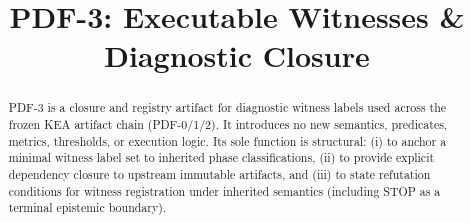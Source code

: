 \documentclass[11pt]{article}
\title{PDF-3: Executable Witnesses \& Diagnostic Closure}
\author{}
\date{}
\begin{document}
\maketitle

\begin{abstract}
PDF-3 is a closure and registry artifact for diagnostic witness labels used across the
frozen KEA artifact chain (PDF-0/1/2). It introduces no new semantics, predicates,
metrics, thresholds, or execution logic. Its sole function is structural: (i) to anchor
a minimal witness label set to inherited phase classifications, (ii) to provide explicit
dependency closure to upstream immutable artifacts, and (iii) to state refutation
conditions for witness registration under inherited semantics (including STOP as a
terminal epistemic boundary).
\end{abstract}







\end{document}
